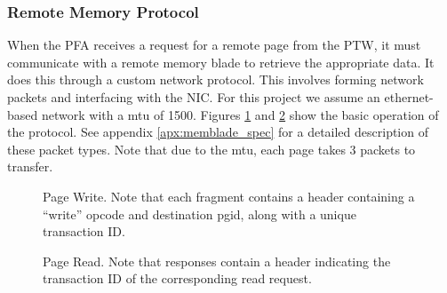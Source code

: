 \subsubsection{Remote Memory Protocol}
When the PFA receives a request for a remote page from the PTW, it must
communicate with a remote \gls{memory blade} to retrieve the appropriate data. It
does this through a custom network protocol. This involves forming network
packets and interfacing with the NIC. For this project we assume an
ethernet-based network with a \gls{mtu} of \SI{1500}{\byte}.
Figures \ref{fig:write_protocol} and \ref{fig:read_protocol} show the basic
operation of the protocol. See appendix \ref{apx:memblade_spec} for a detailed
description of these packet types. Note that due to the \gls{mtu}, each page takes 3
packets to transfer.
\begin{figure}[h]
    \centering
    \begin{sequencediagram}
    \end{sequencediagram}
    \caption{Page Write. Note that each fragment contains a header containing a
    ``write'' opcode and destination \gls{pgid}, along with a unique
    transaction ID.}
		\label{fig:write_protocol}
\end{figure} 
 
\begin{figure}[h]
    \centering
    \begin{sequencediagram}
    \end{sequencediagram}
		\caption{Page Read. Note that responses contain a header indicating the
    transaction ID of the corresponding read request.}
		\label{fig:read_protocol}
\end{figure} 


